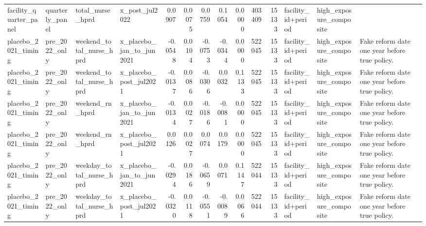 \begin{tabular}{llllrrrrrrrlll}
facility_quarter_panel & quarterly_panel & total_nurse_hprd & x_post_jul2022 & 0.0907 & 0.0075 & 0.0759 & 0.1054 & 0.0000 & 403409 & 15133 & facility_id+period & high_exposure_composite &  \\
placebo_2021_timing & pre_2022_only & weekend_total_nurse_hprd & x_placebo_jan_to_jun2021 & -0.0548 & 0.0104 & -0.0753 & -0.0344 & 0.0000 & 522045 & 15133 & facility_id+period & high_exposure_composite & Fake reform date one year before true policy. \\
placebo_2021_timing & pre_2022_only & weekend_total_nurse_hprd & x_placebo_post_jul2021 & -0.0137 & 0.0086 & -0.0306 & 0.0032 & 0.1133 & 522045 & 15133 & facility_id+period & high_exposure_composite & Fake reform date one year before true policy. \\
placebo_2021_timing & pre_2022_only & weekend_rn_hprd & x_placebo_jan_to_jun2021 & -0.0134 & 0.0027 & -0.0186 & -0.0081 & 0.0000 & 522045 & 15133 & facility_id+period & high_exposure_composite & Fake reform date one year before true policy. \\
placebo_2021_timing & pre_2022_only & weekend_rn_hprd & x_placebo_post_jul2021 & 0.0126 & 0.0027 & 0.0074 & 0.0179 & 0.0000 & 522045 & 15133 & facility_id+period & high_exposure_composite & Fake reform date one year before true policy. \\
placebo_2021_timing & pre_2022_only & weekday_total_nurse_hprd & x_placebo_jan_to_jun2021 & -0.0294 & 0.0186 & -0.0659 & 0.0071 & 0.1147 & 522044 & 15133 & facility_id+period & high_exposure_composite & Fake reform date one year before true policy. \\
placebo_2021_timing & pre_2022_only & weekday_total_nurse_hprd & x_placebo_post_jul2021 & -0.0320 & 0.0118 & -0.0551 & -0.0089 & 0.0066 & 522044 & 15133 & facility_id+period & high_exposure_composite & Fake reform date one year before true policy. \\
\bottomrule
\end{tabular}
